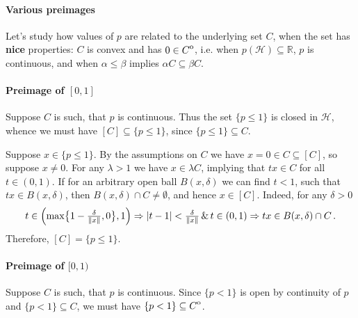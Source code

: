 \documentclass[a4paper]{article}
\newcommand{\Hcal}{\mathcal{H}}
\newcommand{\real}{\mathbb{R}}
\newcommand{\interior}[1]{%
  {\kern0pt#1}^{\mathrm{o}}%
}
\begin{document}

\paragraph{Various preimages} %
\label{par:various_preimages}

Let's study how values of $p$ are related to the underlying set $C$, when the set
has {\bf nice} properties: $C$ is convex and has $0\in \interior{C}$, i.e. when
$p(\Hcal) \subseteq \real$, $p$ is continuous, and when $\alpha \leq \beta$ implies
$\alpha C \subseteq \beta C$. %


\paragraph{Preimage of $[0, 1]$} %
\label{par:preimage_of_0_1_closed}

Suppose $C$ is such, that $p$ is continuous. Thus the set $\{p\leq 1\}$ is closed in
$\Hcal$, whence we must have $[C] \subseteq \{p\leq 1\}$, since $\{p\leq 1\} \subseteq
C$.

Suppose $x\in \{p\leq 1\}$. By the assumptions on $C$ we have $x = 0 \in C \subseteq [C]$,
so suppose $x\neq 0$. For any $\lambda > 1$ we have $x\in \lambda C$, implying that
$t x \in C$ for all $t \in (0, 1)$. If for an arbitrary open ball $B(x, \delta)$ we
can find $t < 1$, such that $t x \in B(x, \delta)$, then $B(x, \delta) \cap C \neq
\emptyset$, and hence $x \in [C]$. Indeed, for any $\delta > 0$
\begin{equation*}
  t \in\Bigl(
    \max\bigl\{1 - \tfrac\delta{\|x\|}, 0\bigr\}, 1
  \Bigr)
    \Rightarrow
      \lvert t - 1\rvert < \tfrac\delta{\|x\|}
      \, \& \, t \in (0, 1)
    \Rightarrow
      t x \in B(x, \delta) \cap C
      \,.
\end{equation*}
Therefore, $[C] = \{p \leq 1\}$.


\paragraph{Preimage of $[0, 1)$} %
\label{par:preimage_of_0_1_open}

Suppose $C$ is such, that $p$ is continuous. Since $\{p < 1\}$ is open by continuity
of $p$ and $\{p < 1\} \subseteq C$, we must have $\{p < 1\} \subseteq \interior{C}$.
\end{document}
